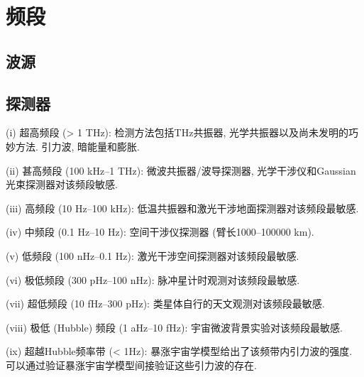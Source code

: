 \chapter{频段}

\section{波源}

\cite{王2020,Schutz1999,Cutler2002,Riles2013}

\section{探测器}

\cite{王2020,Ni2010}

(i) 超高频段 (> 1 THz): 检测方法包括THz共振器, 光学共振器以及尚未发明的巧妙方法. 引力波, 暗能量和膨胀. 

(ii) 甚高频段 (100 kHz--1 THz): 微波共振器/波导探测器, 光学干涉仪和Gaussian光束探测器对该频段敏感. 

(iii) 高频段 (10 Hz--100 kHz): 低温共振器和激光干涉地面探测器对该频段最敏感. 

(iv) 中频段 (0.1 Hz--10 Hz): 空间干涉仪探测器 (臂长1000--100000 km). 

(v) 低频段 (100 nHz--0.1 Hz): 激光干涉空间探测器对该频段最敏感. 

(vi) 极低频段 (300 pHz--100 nHz): 脉冲星计时观测对该频段最敏感. 

(vii) 超低频段 (10 fHz--300 pHz): 类星体自行的天文观测对该频段最敏感. 

(viii) 极低 (Hubble) 频段 (1 aHz--10 fHz): 宇宙微波背景实验对该频段最敏感.

(ix) 超越Hubble频率带 (< 1Hz): 暴涨宇宙学模型给出了该频带内引力波的强度. 可以通过验证暴涨宇宙学模型间接验证这些引力波的存在. 
